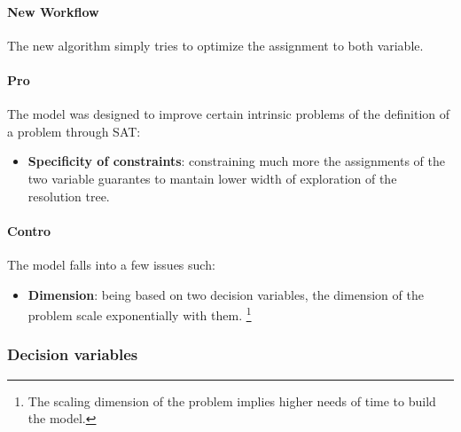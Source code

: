 \paragraph*{New Workflow}
The new algorithm simply tries to optimize the assignment to both variable.

\paragraph*{Pro}
The model was designed to improve certain intrinsic problems of the definition of a problem through SAT:
\begin{itemize}
    \item \textbf{Specificity of constraints}: constraining much more the assignments of the two variable guarantes to mantain lower width of exploration of the resolution tree.
\end{itemize} 

\paragraph*{Contro}
The model falls into a few issues such:

\begin{itemize}
    \item \textbf{Dimension}: being based on two decision variables, the dimension of the problem scale exponentially with them. \footnote{The scaling dimension of the problem implies higher needs of time to build the model.}
\end{itemize}

\subsubsection{Decision variables}

